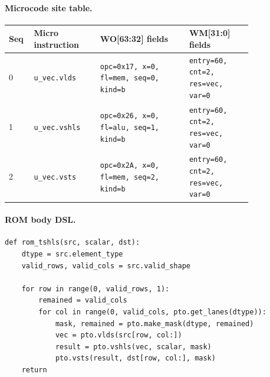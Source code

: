 \paragraph{Microcode site table.}
{\scriptsize
\begin{longtable}{@{}R{0.055\linewidth}L{0.23\linewidth}L{0.31\linewidth}L{0.22\linewidth}@{}}
\toprule
Seq & Micro instruction & WO[63:32] fields & WM[31:0] fields \\
 & \texttt{u\_vec.vlds} & \texttt{opc=0x17, x=0, fl=mem, seq=0, kind=b} & \texttt{entry=60, cnt=2, res=vec, var=0} \\
1 & \texttt{u\_vec.vshls} & \texttt{opc=0x26, x=0, fl=alu, seq=1, kind=b} & \texttt{entry=60, cnt=2, res=vec, var=0} \\
2 & \texttt{u\_vec.vsts} & \texttt{opc=0x2A, x=0, fl=mem, seq=2, kind=b} & \texttt{entry=60, cnt=2, res=vec, var=0} \\
\bottomrule
\end{longtable}
}
\paragraph{ROM body DSL.}
\begin{lstlisting}[style=ptocode]
def rom_tshls(src, scalar, dst):
    dtype = src.element_type
    valid_rows, valid_cols = src.valid_shape

    for row in range(0, valid_rows, 1):
        remained = valid_cols
        for col in range(0, valid_cols, pto.get_lanes(dtype)):
            mask, remained = pto.make_mask(dtype, remained)
            vec = pto.vlds(src[row, col:])
            result = pto.vshls(vec, scalar, mask)
            pto.vsts(result, dst[row, col:], mask)
    return
\end{lstlisting}
\Needspace{0.34\textheight}
